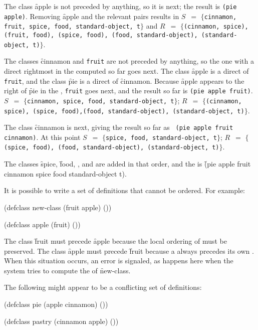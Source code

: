 The class \f{apple} is not preceded by anything, so it is next; the
result is {\tt (pie apple)}. Removing \f{apple} and the relevant
pairs results in $S$~$=$ $\{${\tt cinnamon, fruit, spice, food,
standard-object, t}$\}$ and $R$~$=$ $\{${\tt (cinnamon, spice),
(fruit, food), (spice, food), (food, standard-object),\hfil\break
(standard-object, t)}$\}$.

The classes \f{cinnamon} and {\tt fruit} are not preceded by
anything, so the one with a direct  rightmost in the 
 computed so far goes next.  The class \f{apple} is a
direct  of {\tt fruit}, and the class \f{pie} is a direct
 of \f{cinnamon}.  Because \f{apple} appears to the right
of \f{pie} in the , 
{\tt fruit} goes next, and the
result so far is {\tt (pie apple fruit)}.  $S$~$=$ $\{${\tt cinnamon,
spice, food, standard-object, t}$\}$; $R$~$=$ $\{${\tt (cinnamon,
spice), (spice, food),\hfil\break (food, standard-object),
(standard-object, t)}$\}$.

The class \f{cinnamon} is next, giving the result so far as {\tt
(pie apple fruit cinnamon)}.  At this point $S$~$=$ $\{${\tt spice,
food, standard-object, t}$\}$; $R$~$=$ $\{${\tt (spice, food), (food,
standard-object), (standard-object, t)}$\}$.

The classes \f{spice}, \f{food}, , and 
 are added in that order, and the  
is \f{(pie apple fruit cinnamon spice food standard-object t)}.

It is possible to write a set of  definitions that cannot be 
ordered.   For example: 

\code
 (defclass new-class (fruit apple) ())
 
 (defclass apple (fruit) ())
\endcode

The class \f{fruit} must precede \f{apple} 
because the local ordering of  must be preserved.
The class \f{apple} must precede \f{fruit} 
because a  always precedes its own .
When this situation occurs, an error is signaled, as happens here
when the system tries to compute the  
of \f{new-class}.

The following might appear to be a conflicting set of definitions:

\code
 (defclass pie (apple cinnamon) ())
 
 (defclass pastry (cinnamon apple) ())
 
